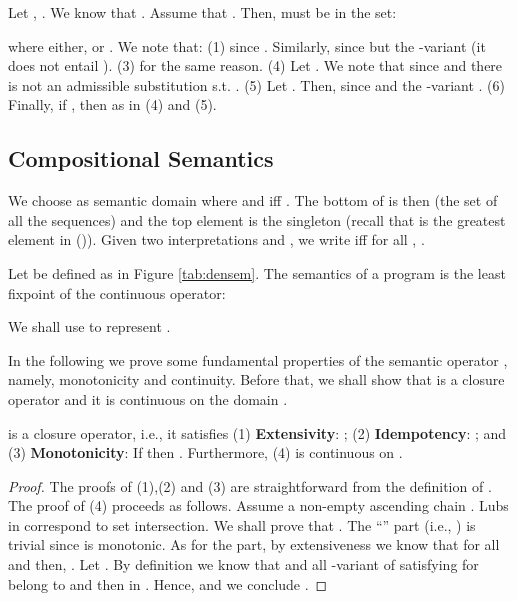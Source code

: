 \documentclass{tlp}
\begin{document}
\begin{example}
Let , .
We know that . Assume that . Then,  must be in the set:

where either,  or . 
We note that: (1)  since . Similarly,  since  but the -variant  (it does not entail ).
(3)  for the same reason. (4) Let .
We note that  since  and
there is not an admissible substitution  s.t. 
. (5) Let 
. Then,  since  and the -variant . (6) Finally, if 
, then   as in  (4) and (5). 

\end{example}



 




\subsection{Compositional Semantics}
We choose as semantic domain   where  and  iff . 
The bottom of   is then  (the set of all the sequences) and 
the top element is the singleton  (recall that    is the greatest element in ()). 
Given two interpretations  and , we write  
iff for all , . 


\begin{definition}\label{def:conc-semantics}
Let  be defined as in Figure \ref{tab:densem}. 
The semantics of a program  is  the least fixpoint of the continuous 
operator:

We shall use   to represent  .
\end{definition}




In the following we prove some fundamental properties of the semantic operator , namely, monotonicity and continuity. Before that, 
we shall show that   is a closure operator and it is continuous on the domain .  

\begin{lemma}[Properties of ]\label{lem:prop-for-all}
 is a closure operator, i.e., it satisfies (1) {\bf Extensivity}: ; (2) {\bf Idempotency}: ; and (3)  {\bf Monotonicity}: If  then . 
Furthermore,  (4)   is continuous on .
\end{lemma}
\begin{proof}
The proofs of (1),(2) and (3) are straightforward from the definition of   . The proof of (4) proceeds as follows. Assume a non-empty ascending chain .
Lubs in  correspond to set intersection.
We shall prove that .
The ``'' part (i.e., ) is trivial since  is monotonic. As for the  part, by extensiveness we know that  for all  and then, . Let . By definition we know that    and all -variant  of  satisfying  for  belong to   and then in . Hence,  and we conclude
.
\end{proof}
\end{document}
